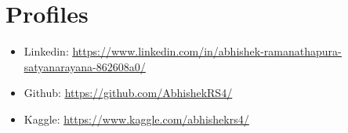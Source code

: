 \documentclass[letterpaper,12pt]{article}
\newcommand{\resumeSubHeadingListStart}{\begin{itemize}[leftmargin=*]}
\newcommand{\resumeSubHeadingListEnd}{\end{itemize}}
\begin{document}
\section{Profiles}
    \resumeSubHeadingListStart
        \item{Linkedin: \underline{\href{https://www.linkedin.com/in/abhishek-ramanathapura-satyanarayana-862608a0/}{https://www.linkedin.com/in/abhishek-ramanathapura-satyanarayana-862608a0/}}}
        \item{Github: \underline{\href{https://github.com/AbhishekRS4/}{https://github.com/AbhishekRS4/}}}
        \item{Kaggle: \underline{\href{https://www.kaggle.com/abhishekrs4/}{https://www.kaggle.com/abhishekrs4/}}}
    \resumeSubHeadingListEnd

\end{document}
